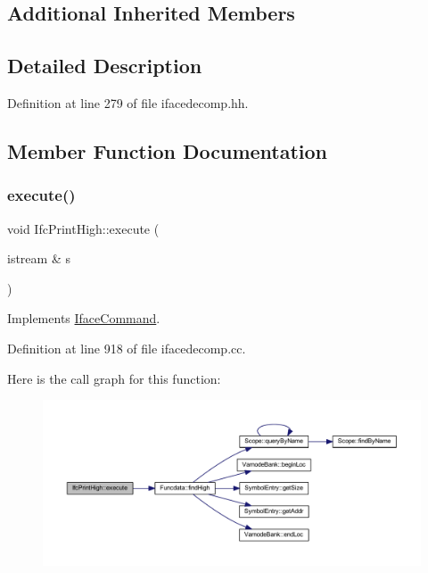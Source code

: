 \subsection*{Additional Inherited Members}


\subsection{Detailed Description}


Definition at line 279 of file ifacedecomp.\+hh.



\subsection{Member Function Documentation}
\mbox{\label{class_ifc_print_high_a1ab0611a565a7dd33a40da7950e0ef17}} 
\subsubsection{\texorpdfstring{execute()}{execute()}}
{\footnotesize\ttfamily void Ifc\+Print\+High\+::execute (\begin{DoxyParamCaption}\item[{istream \&}]{s }\end{DoxyParamCaption})\hspace{0.3cm}{\ttfamily [virtual]}}



Implements \mbox{\hyperlink{class_iface_command_af10e29cee2c8e419de6efe9e680ad201}{Iface\+Command}}.



Definition at line 918 of file ifacedecomp.\+cc.

Here is the call graph for this function\+:
\nopagebreak
\begin{figure}[H]
\begin{center}
\leavevmode
\includegraphics[width=350pt]{class_ifc_print_high_a1ab0611a565a7dd33a40da7950e0ef17_cgraph}
\end{center}
\end{figure}


